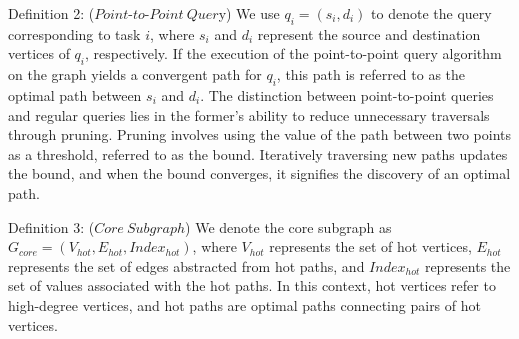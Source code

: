 \documentclass[lettersize,journal]{IEEEtran} %
\begin{document}
Definition 2: ($Point \text{-} to \text{-} Point~Quer$y) We use $q_i=(s_i,d_i)$ to denote the query corresponding to task $i$, where $s_i$ and $d_i$ represent the source and destination vertices of $q_i$, respectively. If the execution of the point-to-point query algorithm on the graph yields a convergent path for $q_i$, this path is referred to as the optimal path between $s_i$ and $d_i$. The distinction between point-to-point queries and regular queries lies in the former's ability to reduce unnecessary traversals through pruning. Pruning involves using the value of the path between two points as a threshold, referred to as the bound. Iteratively traversing new paths updates the bound, and when the bound converges, it signifies the discovery of an optimal path.

Definition 3: ($Core~Subgraph$) We denote the core subgraph as $G_{core}=(V_{hot},E_{hot},Index_{hot})$, where $V_{hot}$ represents the set of hot vertices, $E_{hot}$ represents the set of edges abstracted from hot paths, and $Index_{hot}$ represents the set of values associated with the hot paths. In this context, hot vertices refer to high-degree vertices, and hot paths are optimal paths connecting pairs of hot vertices.
\end{document}

